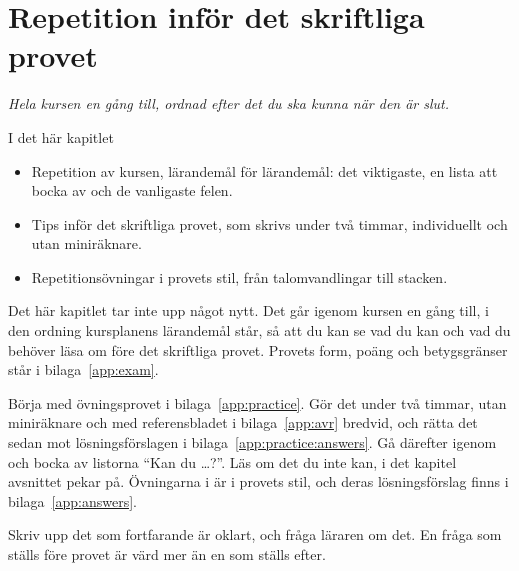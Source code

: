 %

\chapter{Repetition inför det skriftliga provet}
\label{c12:ch}

{\large\itshape Hela kursen en gång till, ordnad efter det du ska kunna när den är slut.\par}

\begin{chapterbox}{I det här kapitlet}
\begin{itemize}
  \item Repetition av kursen, lärandemål för lärandemål: det viktigaste, en lista att bocka av och
    de vanligaste felen.
  \item Tips inför det skriftliga provet, som skrivs under två timmar, individuellt och utan
    miniräknare.
  \item Repetitionsövningar i provets stil, från talomvandlingar till stacken.
\end{itemize}
\end{chapterbox}

Det här kapitlet tar inte upp något nytt. Det går igenom kursen en gång till, i den ordning
kursplanens lärandemål står, så att du kan se vad du kan och vad du behöver läsa om före det
skriftliga provet. Provets form, poäng och betygsgränser står i bilaga~\ref{app:exam}.

Börja med övningsprovet i bilaga~\ref{app:practice}. Gör det under två timmar, utan miniräknare och
med referensbladet i bilaga~\ref{app:avr} bredvid, och rätta det sedan mot lösningsförslagen i
bilaga~\ref{app:practice:answers}. Gå därefter igenom  och bocka av listorna
\enquote{Kan du \dots?}. Läs om det du inte kan, i det kapitel avsnittet pekar på. Övningarna i
 är i provets stil, och deras lösningsförslag finns i
bilaga~\ref{app:answers}.

Skriv upp det som fortfarande är oklart, och fråga läraren om det. En fråga som ställs före provet
är värd mer än en som ställs efter.




